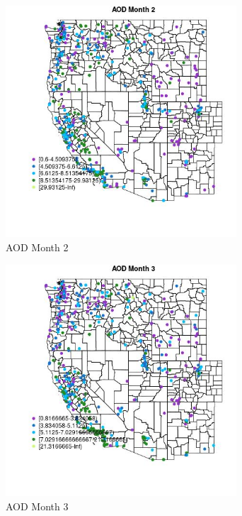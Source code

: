 \begin{figure} 
\centering  
\includegraphics[width=0.77\textwidth]{Code_Outputs/ML_input_report_ML_input_PM25_Step5_part_d_de_duplicated_aves_ML_input_MapObsMo2AOD.jpg} 
\caption{\label{fig:ML_input_report_ML_input_PM25_Step5_part_d_de_duplicated_aves_ML_inputMapObsMo2AOD}AOD Month 2} 
\end{figure} 
 

\begin{figure} 
\centering  
\includegraphics[width=0.77\textwidth]{Code_Outputs/ML_input_report_ML_input_PM25_Step5_part_d_de_duplicated_aves_ML_input_MapObsMo3AOD.jpg} 
\caption{\label{fig:ML_input_report_ML_input_PM25_Step5_part_d_de_duplicated_aves_ML_inputMapObsMo3AOD}AOD Month 3} 
\end{figure} 
 

